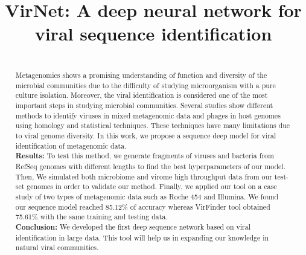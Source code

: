 \documentclass[conference]{IEEEtran}
\begin{document}
\title{VirNet: A deep neural network for viral sequence identification}


\author{
\and
{}
\and
{}
\and
{}
}

\maketitle

\begin{abstract}\\Metagenomics shows a promising understanding of function and diversity of the microbial communities due to the difficulty of studying microorganism with a pure culture isolation. Moreover, the viral identification is considered one of the most important steps in studying microbial communities. Several studies show different methods to identify viruses in mixed metagenomic data and phages in host genomes using homology and statistical techniques. These techniques have many limitations due to viral genome diversity. In this work, we propose a sequence deep model for viral identification of metagenomic data.\\
\textbf{Results:} To test this method, we generate fragments of viruses and bacteria from RefSeq genomes with different lengths to find the best hyperparameters of our model. Then, We simulated both microbiome and virome high throughput data from our test-set genomes in order to validate our method. Finally, we applied our tool on a case study of two types of metagenomic data such as Roche 454 and Illumina. We found our sequence model reached 85.12\% of accuracy whereas VirFinder tool obtained 75.61\% with the same training and testing data.\\
\textbf{Conclusion:} We developed the first deep sequence network based on viral identification in large data. This tool will help us in expanding our knowledge in natural viral communities.
\end{abstract}
\end{document}
